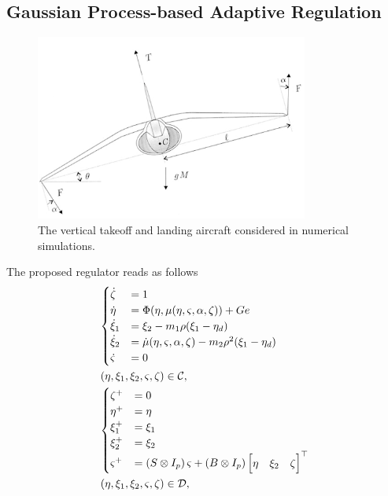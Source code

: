 \subsection{Gaussian Process-based Adaptive Regulation}%
\label{SEC:OR-POST-PROCESSING-LEARNING-DRIVEN-REGULATION}
\begin{figure}[!t]
	\centering
	\includegraphics[width=0.8\textwidth]{Figs/Chapter8-9/postprocessing_vtol.png}
	\caption{The vertical takeoff and landing aircraft considered in numerical simulations.}
	\label{FIG:OR-POSTPROCESSING-VERTICAL-TOL}
\end{figure}
The proposed regulator reads as follows
\begin{equation}%
   \label{EQ:OR-POST-PROCESSING-OVERALL-REGULATOR}
   \begin{split}
      &
      \begin{cases}
         \dot{\clock} & = 1 \\
         \dot{\im} & = \imfun(\im, \pmu(\im, \id, \alpha, \clock)) + Ge \\
         \dot{\obs}_1 & = \obs_2 - m_1 \obsgain(\obs_1 - \im_d) \\
         \dot{\obs}_2 & = \dot{\pmu}(\im, \id, \alpha, \clock) - m_2 \obsgain^2 (\obs_1 - \im_d) \\
         \dot{\id} & = 0 \\
      \end{cases} \\
      & \lp \im, \obs_1, \obs_2, \id, \clock \rp \in \CC, \\
      &
      \begin{cases}
         \clock^{+} & = 0 \\
         \im^{+} & = \im \\
         \obs_1^{+} & = \obs_1 \\
         \obs_2^{+} & = \obs_2 \\
         \id^{+} & = \lp S \otimes I_{p}\rp \id + \lp B \otimes I_{p}\rp \begin{bmatrix} \im & \obs_2 & \clock \end{bmatrix}\T \\
      \end{cases} \\
      & \lp \im, \obs_1, \obs_2, \id, \clock \rp \in \DD, \\
   \end{split}
\end{equation}
